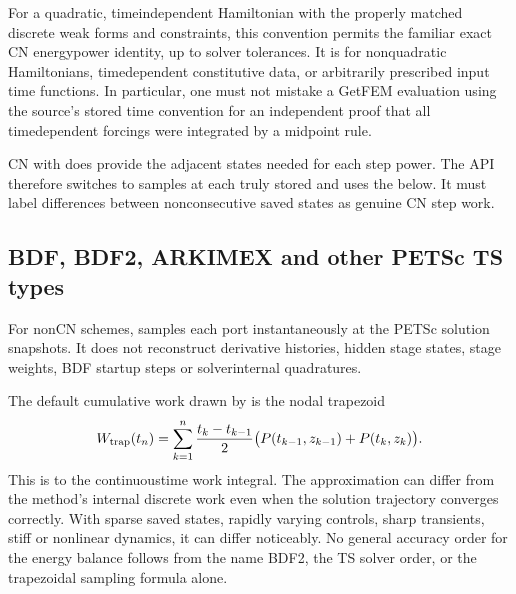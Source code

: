 \documentclass[letterpaper,10pt,english]{sphinxmanual}
\begin{document}
\sphinxAtStartPar
For a quadratic, time\sphinxhyphen{}independent Hamiltonian with the properly matched
discrete weak forms and constraints, this convention permits the familiar
 exact CN energy\sphinxhyphen{}power identity, up to solver tolerances.
It is  for nonquadratic Hamiltonians,
time\sphinxhyphen{}dependent constitutive data, or arbitrarily prescribed input
time functions. In particular, one must not mistake a GetFEM evaluation
using the source’s stored time convention for an independent proof that
all time\sphinxhyphen{}dependent forcings were integrated by a midpoint rule.

\sphinxAtStartPar
CN with  does  provide the adjacent states
needed for each step power. The API therefore switches to
 samples at each truly stored 
and uses the  below.
It must  label differences between nonconsecutive saved
states as genuine CN step work.


\subsection{BDF, BDF2, ARKIMEX and other PETSc TS types}
\label{\detokenize{energy_and_power:bdf-bdf2-arkimex-and-other-petsc-ts-types}}
\sphinxAtStartPar
For non\sphinxhyphen{}CN schemes,  samples each port
instantaneously at the  PETSc solution snapshots.
It does not reconstruct derivative histories, hidden stage states,
stage weights, BDF startup steps or solver\sphinxhyphen{}internal quadratures.

\sphinxAtStartPar
The default cumulative work drawn by
{\hyperref[\detokenize{scrimp:scrimp.dphs.DPHS.plot_Hamiltonian}]{}} is the nodal trapezoid
\begin{equation*}
\begin{split}W_{\rm trap}(t_n)
= \sum_{k=1}^{n}\frac{t_k-t_{k-1}}{2}
  \bigl(P(t_{k-1},z_{k-1})+P(t_k,z_k)\bigr).\end{split}
\end{equation*}
\sphinxAtStartPar
This is  to the continuous\sphinxhyphen{}time
work integral. The approximation can differ from the method’s internal
discrete work even when the solution trajectory converges correctly.
With sparse saved states, rapidly varying controls, sharp transients,
stiff or nonlinear dynamics, it can differ noticeably. No general
accuracy order for the energy balance follows from the name BDF2,
the TS solver order, or the trapezoidal sampling formula alone.
\end{document}
